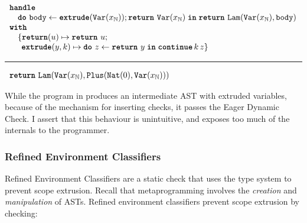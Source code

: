\begin{code}
  \begin{efflst}
    $\begin{array}{l}
      \textbf{\texttt{handle}} \\
      \quad \texttt{\textbf{do}} \,\, {\texttt{body}} \leftarrow {\textbf{\texttt{extrude}}({\texttt{Var}(x_{\mathbb{N}})}); \texttt{\textbf{return}} \,\, {\texttt{Var}(x_{\mathbb{N}})}} \; \textbf{\texttt{in}} \; {\texttt{\textbf{return}} \,\, {\texttt{Lam}(\texttt{Var}(x_{\mathbb{N}}), \texttt{body})}} \\
      \textbf{\texttt{with}} \\
      \quad \{ \textbf{\texttt{return}}(u) \mapsto \texttt{\textbf{return}} \,\, {u}; \\
      \quad \; \, \textbf{\texttt{extrude}}(y, k) \mapsto { \texttt{\textbf{do}} \,\, {z} \leftarrow {\texttt{\textbf{return}} \,\, {y}} \; \textbf{\texttt{in}} \; {\textbf{\texttt{continue}} \, {k} \, {z}}} \}\\
    \end{array}$

    \vspace{2mm} 
\textcolor{effComment}{\hrule height 0.2mm \relax}
\vspace{2mm} 

\textcolor{effComment}{$\begin{array}{l}\texttt{\textbf{return}} \,\, {\texttt{Lam}(\texttt{Var}(x_{\mathbb{N}}), \texttt{Plus}(\texttt{Nat}({0}), \texttt{Var}(x_{\mathbb{N}})))}\end{array}$}

\end{efflst}
%
\label{listing:efflang-maybe-not-scope-extrusion}
\end{code}

While the program in  produces an intermediate AST with extruded variables, because of the mechanism for inserting checks, it passes the Eager Dynamic Check. I assert that this behaviour is unintuitive, and exposes too much of the internals to the programmer. 

\subsubsection{Refined Environment Classifiers}\label{subsubsection:refined-environment-classifiers}
Refined Environment Classifiers are a static check that uses the type system to prevent scope extrusion. Recall that metaprogramming involves the \textit{creation} and \textit{manipulation} of ASTs. Refined environment classifiers prevent scope extrusion by checking:

